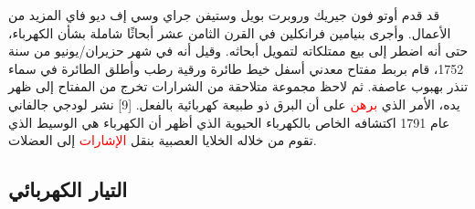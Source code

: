 \documentclass[a4paper]{book}
\begin{document}
 قد قدم أوتو فون جيريك وروبرت بويل وستيفن جراي وسي إف ديو فاي المزيد من
الأعمال. وأجرى بنيامين فرانكلين في القرن الثامن عشر أبحاثًا شاملة بشأن
الكهرباء، حتى أنه اضطر إلى بيع ممتلكاته لتمويل أبحاثه. وقيل أنه في شهر
حزيران/يونيو من سنة 1752، قام بربط مفتاح معدني أسفل خيط طائرة ورقية
رطب وأطلق الطائرة في سماء تنذر بهبوب عاصفة. ثم لاحظ مجموعة متلاحقة من
الشرارات تخرج من المفتاح إلى ظهر يده، الأمر الذي \textcolor{red}{برهن}
على أن البرق ذو طبيعة كهربائية بالفعل. [9] نشر لودجي جالفاني عام 1791
اكتشافه الخاص بالكهرباء الحيوية الذي أظهر أن الكهرباء هي الوسيط الذي
تقوم من خلاله الخلايا العصبية بنقل \textcolor{red}{الإشارات} إلى
العضلات.

\subsection{التيار الكهربائي}
\end{document}

